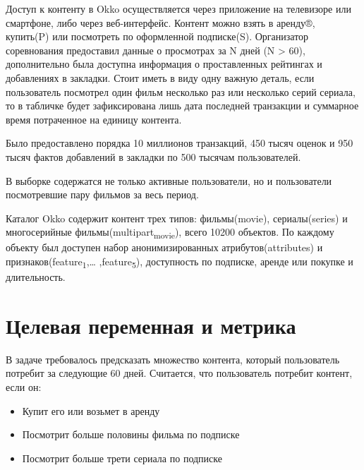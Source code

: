 \documentclass[11pt]{article}
\begin{document}
Доступ к контенту в Okko осуществляется через приложение на телевизоре или смартфоне, либо через веб-интерфейс. Контент можно взять в аренду®, купить(P) или посмотреть по оформленной подписке(S). Организатор соревнования предоставил данные о просмотрах за N дней (N > 60), дополнительно была доступна информация о проставленных рейтингах и добавлениях в закладки. Стоит иметь в виду одну важную деталь, если пользователь посмотрел один фильм несколько раз или несколько серий сериала, то в табличке будет зафиксирована лишь дата последней транзакции и суммарное время потраченное на единицу контента.

Было предоставлено порядка 10 миллионов транзакций, 450 тысяч оценок и 950 тысяч фактов добавлений в закладки по 500 тысячам пользователей.

В выборке содержатся не только активные пользователи, но и пользователи посмотревшие пару фильмов за весь период.

Каталог Okko содержит контент трех типов: фильмы(movie), сериалы(series) и многосерийные фильмы(multipart\textsubscript{movie}), всего 10200 объектов. По каждому объекту был доступен набор анонимизированных атрибутов(attributes) и признаков(feature\textsubscript{1},… ,feature\textsubscript{5}), доступность по подписке, аренде или покупке и длительность. 

\section{Целевая переменная и метрика}
\label{sec:orgd28bef7}
В задаче требовалось предсказать множество контента, который пользователь потребит за следующие 60 дней. Считается, что пользователь потребит контент, если он:

\begin{itemize}
\item Купит его или возьмет в аренду
\item Посмотрит больше половины фильма по подписке
\item Посмотрит больше трети сериала по подписке
\end{itemize}
\end{document}
